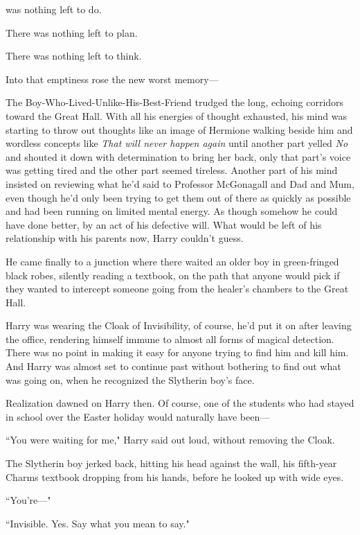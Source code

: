 
 was nothing left to do.

\hplettrineextrapara
There was nothing left to plan.

There was nothing left to think.

Into that emptiness rose the new worst memory—

The Boy-Who-Lived-Unlike-His-Best-Friend trudged the long, echoing corridors toward the Great Hall. With all his energies of thought exhausted, his mind was starting to throw out thoughts like an image of Hermione walking beside him and wordless concepts like \emph{That will never happen again} until another part yelled \emph{No} and shouted it down with determination to bring her back, only that part's voice was getting tired and the other part seemed tireless. Another part of his mind insisted on reviewing what he'd said to Professor McGonagall and Dad and Mum, even though he'd only been trying to get them out of there as quickly as possible and had been running on limited mental energy. As though somehow he could have done better, by an act of his defective will. What would be left of his relationship with his parents now, Harry couldn't guess.

He came finally to a junction where there waited an older boy in green-fringed black robes, silently reading a textbook, on the path that anyone would pick if they wanted to intercept someone going from the healer's chambers to the Great Hall.

Harry was wearing the Cloak of Invisibility, of course, he'd put it on after leaving the office, rendering himself immune to almost all forms of magical detection. There was no point in making it easy for anyone trying to find him and kill him. And Harry was almost set to continue past without bothering to find out what was going on, when he recognized the Slytherin boy's face.

Realization dawned on Harry then. Of course, one of the students who had stayed in school over the Easter holiday would naturally have been—

``You were waiting for me," Harry said out loud, without removing the Cloak.

The Slytherin boy jerked back, hitting his head against the wall, his fifth-year Charms textbook dropping from his hands, before he looked up with wide eyes.

``You're—"

``Invisible. Yes. Say what you mean to say."

